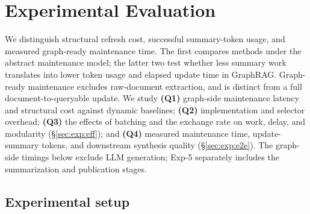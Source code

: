 \section{Experimental Evaluation}
\label{sec:exp}

We distinguish structural refresh cost, successful summary-token usage, and
measured graph-ready maintenance time. The first compares methods under the
abstract maintenance model; the latter two test whether less summary work
translates into lower token usage and elapsed update time in GraphRAG.
Graph-ready maintenance excludes raw-document extraction, and is distinct
from a full document-to-queryable update.
We study \textbf{(Q1)} graph-side maintenance latency and structural cost
against dynamic baselines; \textbf{(Q2)} implementation and selector overhead;
\textbf{(Q3)} the effects of batching and the exchange rate on work, delay,
and modularity (\S\ref{sec:exp:eff}); and \textbf{(Q4)} measured maintenance
time, update-summary tokens, and downstream synthesis quality
(\S\ref{sec:exp:e2e}). The graph-side timings below exclude LLM generation;
Exp-5 separately includes the summarization and publication stages.

\subsection{Experimental setup}
\label{sec:exp:setup}

